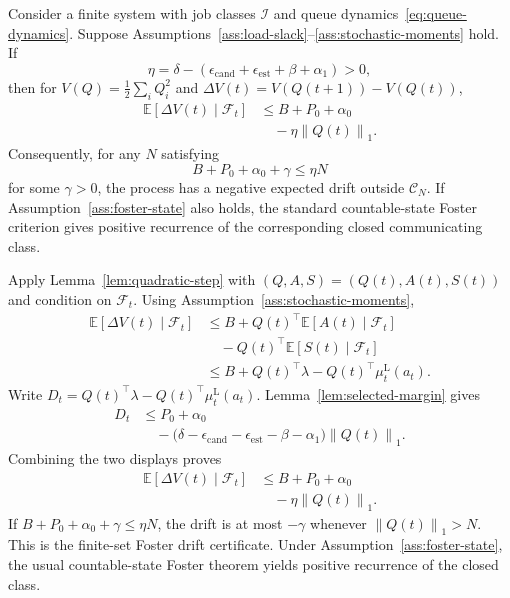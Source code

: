 \documentclass[opre,dblanonrev]{informs4}
\newcommand{\E}{\mathbb E}
\newcommand{\lowermu}{\mu^{\mathrm L}}
\newcommand{\normone}[1]{\left\|#1\right\|_1}
\begin{document}
\begin{theorem}
\label{thm:main}
Consider a finite system with job classes \(\mathcal I\) and queue
dynamics~\eqref{eq:queue-dynamics}.  Suppose
Assumptions~\ref{ass:load-slack}--\ref{ass:stochastic-moments} hold.  If
\begin{equation}
  \eta=\delta-(\epsilon_{\mathrm{cand}}+\epsilon_{\mathrm{est}}+\beta+\alpha_1)>0,
\end{equation}
then for \(V(Q)=\frac12\sum_i Q_i^2\) and
\(\Delta V(t)=V(Q(t+1))-V(Q(t))\),
\begin{equation}
  \begin{aligned}
  \E[\Delta V(t)\mid\mathcal F_t]
  &\le B+P_0+\alpha_0\\
  &\quad{}-\eta\normone{Q(t)}.
  \end{aligned}
\end{equation}
Consequently, for any \(N\) satisfying
\begin{equation}
  B+P_0+\alpha_0+\gamma \le \eta N
\end{equation}
for some \(\gamma>0\), the process has a negative expected drift outside
\(\mathcal C_N\).  If Assumption~\ref{ass:foster-state} also holds,
the standard countable-state Foster criterion gives positive recurrence of the
corresponding closed communicating class.
\end{theorem}

Apply Lemma~\ref{lem:quadratic-step} with
\((Q,A,S)=(Q(t),A(t),S(t))\) and condition on \(\mathcal F_t\).  Using
Assumption~\ref{ass:stochastic-moments},
\begin{equation}
  \begin{aligned}
  \E[\Delta V(t)\mid\mathcal F_t]
  &\le B
  +Q(t)^\top\E[A(t)\mid\mathcal F_t]\\
  &\quad{}-Q(t)^\top\E[S(t)\mid\mathcal F_t]\\
  &\le B+Q(t)^\top\lambda
       -Q(t)^\top\lowermu_t(a_t).
  \end{aligned}
\end{equation}
Write
\(D_t=Q(t)^\top\lambda-Q(t)^\top\lowermu_t(a_t)\).
Lemma~\ref{lem:selected-margin} gives
\begin{equation}
  \begin{aligned}
  D_t&\le P_0+\alpha_0\\
  &\quad{}-
  \bigl(\delta-\epsilon_{\mathrm{cand}}
  -\epsilon_{\mathrm{est}}
  -\beta-\alpha_1\bigr)\normone{Q(t)}.
  \end{aligned}
\end{equation}
Combining the two displays proves
\begin{equation}
  \begin{aligned}
  \E[\Delta V(t)\mid\mathcal F_t]
  &\le B+P_0+\alpha_0\\
  &\quad{}-\eta\normone{Q(t)}.
  \end{aligned}
\end{equation}
If \(B+P_0+\alpha_0+\gamma\le\eta N\), the drift is at most
\(-\gamma\) whenever \(\normone{Q(t)}>N\).  This is the finite-set Foster drift
certificate.  Under Assumption~\ref{ass:foster-state}, the usual
countable-state Foster theorem yields positive recurrence of the closed class.
\endproof
\end{document}
